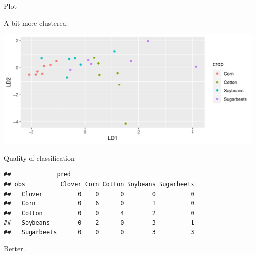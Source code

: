 \begin{frame}[fragile]{Plot}

A bit more clustered:
  
\begin{knitrout}
\color{fgcolor}\begin{kframe}
\begin{alltt}
\hlstd{(}\hlopt{+}
  \hlstd{()}\hlopt{+}\hlstd{()}\hlopt{+}\hlstd{(}
\end{alltt}
\end{kframe}
\includegraphics[width=\maxwidth]{figure/nedved-1} 

\end{knitrout}

\end{frame}

\begin{frame}[fragile]{Quality of classification}
  
\begin{knitrout}
\color{fgcolor}\begin{kframe}
\begin{alltt}
\hlstd{(}\hlopt{$}\hlopt{$}
\end{alltt}
\begin{verbatim}
##             pred
## obs          Clover Corn Cotton Soybeans Sugarbeets
##   Clover          0    0      0        0          0
##   Corn            0    6      0        1          0
##   Cotton          0    0      4        2          0
##   Soybeans        0    2      0        3          1
##   Sugarbeets      0    0      0        3          3
\end{verbatim}
\end{kframe}
\end{knitrout}

Better.
  
\end{frame}

